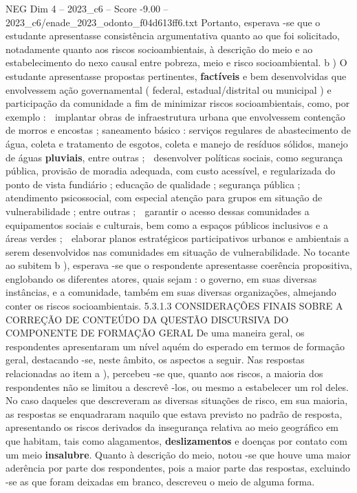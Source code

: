 \begin{textsample}{NEG Dim 4 – 2023\_c6 – Score -9.00 – 2023\_c6/enade\_2023\_odonto\_f04d613ff6.txt}
Portanto, esperava -se que o estudante apresentasse consistência argumentativa quanto ao que foi solicitado, notadamente quanto aos riscos socioambientais, à descrição do meio e ao estabelecimento do nexo causal entre pobreza, meio e risco socioambiental. b ) O estudante apresentasse propostas pertinentes, \textbf{factíveis} e bem desenvolvidas que envolvessem ação governamental ( federal, estadual/distrital ou municipal ) e participação da comunidade a fim de minimizar riscos socioambientais, como, por exemplo :  implantar obras de infraestrutura urbana que envolvessem contenção de morros e encostas ; saneamento básico : serviços regulares de abastecimento de água, coleta e tratamento de esgotos, coleta e manejo de resíduos sólidos, manejo de águas \textbf{pluviais}, entre outras ;  desenvolver políticas sociais, como segurança pública, provisão de moradia adequada, com custo acessível, e regularizada do ponto de vista fundiário ; educação de qualidade ; segurança pública ; atendimento psicossocial, com especial atenção para grupos em situação de vulnerabilidade ; entre outras ;  garantir o acesso dessas comunidades a equipamentos sociais e culturais, bem como a espaços públicos inclusivos e a áreas verdes ;  elaborar planos estratégicos participativos urbanos e ambientais a serem desenvolvidos nas comunidades em situação de vulnerabilidade.
No tocante ao subitem b ), esperava -se que o respondente apresentasse coerência propositiva, englobando os diferentes atores, quais sejam : o governo, em suas diversas instâncias, e a comunidade, também em suas diversas organizações, almejando conter os riscos socioambientais. 5.3.1.3 CONSIDERAÇÕES FINAIS SOBRE A CORREÇÃO DE CONTEÚDO DA QUESTÃO DISCURSIVA DO COMPONENTE DE FORMAÇÃO GERAL De uma maneira geral, os respondentes apresentaram um nível aquém do esperado em termos de formação geral, destacando -se, neste âmbito, os aspectos a seguir.
Nas respostas relacionadas ao item a ), percebeu -se que, quanto aos riscos, a maioria dos respondentes não se limitou a descrevê -los, ou mesmo a estabelecer um rol deles.
No caso daqueles que descreveram as diversas situações de risco, em sua maioria, as respostas se enquadraram naquilo que estava previsto no padrão de resposta, apresentando os riscos derivados da insegurança relativa ao meio geográfico em que habitam, tais como alagamentos, \textbf{deslizamentos} e doenças por contato com um meio \textbf{insalubre}.
Quanto à descrição do meio, notou -se que houve uma maior aderência por parte dos respondentes, pois a maior parte das respostas, excluindo -se as que foram deixadas em branco, descreveu o meio de alguma forma.

\end{textsample}
